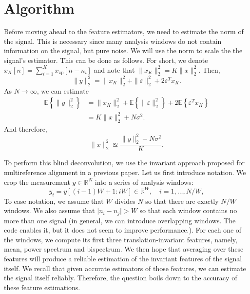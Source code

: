 \documentclass[journal]{IEEEtran}
\numberwithin{equation}{section}
\numberwithin{figure}{section}
\theoremstyle{plain}
\theoremstyle{definition}
\theoremstyle{remark}
\theoremstyle{plain}
\theoremstyle{remark}
\theoremstyle{plain}
\theoremstyle{plain}
\newcommand{\RN}{\mathbb{R}^N}
\newcommand{\E}[1]{\mathbb{E}\left\{{#1} \right\}}
\newcommand{\xz}{x_{\textrm{zp}}}
\begin{document}
   

\section{Algorithm} \label{sec:algorithm}


Before moving ahead to the feature estimators, we need to estimate the norm of the signal. This is necessary since many analysis windows do not contain information on the signal, but pure noise. We will use the norm to scale the the signal's estimator.
This can be done as follows. For short, we denote $x_K[n]=\sum_{i=1}^K \xz[n-n_i]$ and note that $\|x_K\|_2^2 = K\|x\|_2^2$. 
Then,
\begin{equation}
\| y\|_2^2 =  \| x_K\|_2^2 + \|\varepsilon\|_2^2 + 2\varepsilon^Tx_K. 
\end{equation}  
As $N\to\infty$, we can estimate 
\begin{equation}
\begin{split}
\E{\| y\|_2^2} &=  \| x_K\|_2^2 + \E{\|\varepsilon\|_2^2} + 2\E{\varepsilon^Tx_K} \\ 
&= K\|x\|_2^2 + N\sigma^2. 
\end{split}	 
\end{equation}   
And therefore, 
\begin{equation}
\|x\|_2^2 \approxeq \frac{\| y\|_2^2 - N\sigma^2}{K}. 
\end{equation}




To perform this blind deconvolution, we use the invariant approach proposed for multireference alignment in a previous paper. Let us  first introduce  notation. We crop the measurement $y\in\RN$ into a series of analysis windows: 
\begin{equation}
y_i = y[(i-1)W + 1 : iW ]\in\mathbb{R}^W, \quad i=1,\ldots,N/W, 
\end{equation}
To ease notation, we assume that  $W$ divides $N$  so that there are exactly $N/W$ windows. We also assume that $\vert n_i - n_j\vert >W$ so that each window contains no more than one signal (in general, we can introduce overlapping windows. The code enables it, but it does not seem to improve performance.).
For each one of the windows, we compute its first three translation-invariant features, namely, mean, power spectrum and bispectrum. We then hope that averaging over these features will produce a reliable estimation of the invariant features of the signal itself. 
We recall that given accurate estimators of those features, we can estimate the signal itself reliably. Therefore, the question boils down to the accuracy of these feature estimations.
\end{document}
